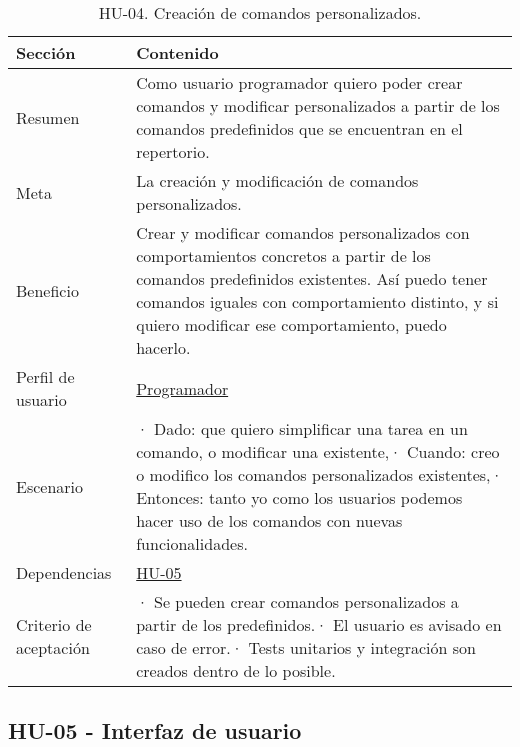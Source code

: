 \begin{table}[H]
    \centering
    \def\arraystretch{1.25}
    \begin{adjustbox}{max width=\textwidth}
    \begin{tabularx}{\textwidth}{|l|L|}
    \hline
        \textbf{Sección} & \textbf{Contenido} \\ \hline
    \hline
        Resumen & Como usuario programador quiero poder crear comandos y modificar personalizados a partir de los comandos predefinidos que se encuentran en el repertorio. \\ \hline
        Meta & La creación y modificación de comandos personalizados. \\ \hline
        Beneficio & Crear y modificar comandos personalizados con comportamientos concretos a partir de los comandos predefinidos existentes. Así puedo tener comandos iguales con comportamiento distinto, y si quiero modificar ese comportamiento, puedo hacerlo. \\ \hline
        Perfil de usuario & \hyperref[sec:personaProgramador]{Programador} \\ \hline
        Escenario & · Dado: que quiero simplificar una tarea en un comando, o modificar una existente,\linebreak · Cuando: creo o modifico los comandos personalizados existentes,\linebreak · Entonces: tanto yo como los usuarios podemos hacer uso de los comandos con nuevas funcionalidades. \\ \hline
        Dependencias & \hyperref[sec:hu05]{HU-05} \\ \hline
        Criterio de aceptación & · Se pueden crear comandos personalizados a partir de los predefinidos.\linebreak · El usuario es avisado en caso de error.\linebreak · Tests unitarios y integración son creados dentro de lo posible. \\ \hline
    \end{tabularx}
    \end{adjustbox}
    \caption{HU-04. Creación de comandos personalizados.}
\end{table}

\subsection{HU-05 - Interfaz de usuario}
\label{sec:hu05}

